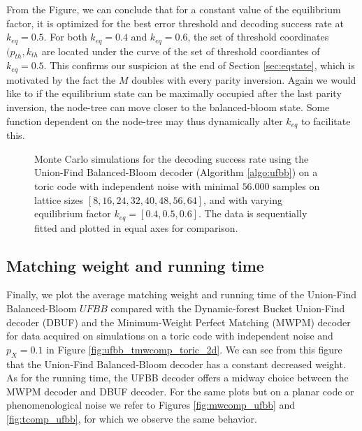 From the Figure, we can conclude that for a constant value of the equilibrium factor, it is optimized for the best error threshold and decoding success rate at $k_{eq}=0.5$. For both $k_{eq}=0.4$ and $k_{eq}=0.6$, the set of threshold coordinates $(p_{th}, k_{th}$ are located under the curve of the set of threshold coordiantes of $k_{eq}=0.5$. This confirms our suspicion at the end of Section \ref{sec:eqstate}, which is motivated by the fact the $M$ doubles with every parity inversion. Again we would like to if the equilibrium state can be maximally occupied after the last parity inversion, the node-tree can move closer to the balanced-bloom state. Some function dependent on the node-tree may thus dynamically alter $k_{eq}$ to facilitate this. 

\begin{figure}[htbp]
  \centering
  \begin{subfigure}[b]{\textwidth}
    \begin{adjustbox}{Clip=0 1em 0 0}
      
    \end{adjustbox}
  \end{subfigure}

  \begin{subfigure}[b]{\textwidth}
    \begin{adjustbox}{Clip=0 1em 0 0}
      
    \end{adjustbox}
  \end{subfigure}

\caption{Monte Carlo simulations for the decoding success rate using the Union-Find Balanced-Bloom decoder (Algorithm \ref{algo:ufbb}) on a toric code with independent noise with minimal $56.000$ samples on lattice sizes $[8, 16, 24, 32, 40, 48, 56, 64]$, and with varying equilibrium factor $k_{eq} = [0.4, 0.5, 0.6]$. The data is sequentially fitted and plotted in equal axes for comparison.}
  \label{fig:thres_ufbb_toric_2d_fb}
\end{figure}

\subsection{Matching weight and running time}

Finally, we plot the average matching weight and running time of the Union-Find Balanced-Bloom $UFBB$ compared with the Dynamic-forest Bucket Union-Find decoder (DBUF) and the Minimum-Weight Perfect Matching (MWPM) decoder for data acquired on simulations on a toric code with independent noise and $p_X = 0.1$ in Figure \ref{fig:ufbb_tmwcomp_toric_2d}. We can see from this figure that the Union-Find Balanced-Bloom decoder has a constant decreased weight. As for the running time, the UFBB decoder offers a midway choice between the MWPM decoder and DBUF decoder. For the same plots but on a planar code or phenomenological noise we refer to Figures \ref{fig:mwcomp_ufbb} and \ref{fig:tcomp_ufbb}, for which we observe the same behavior. 

